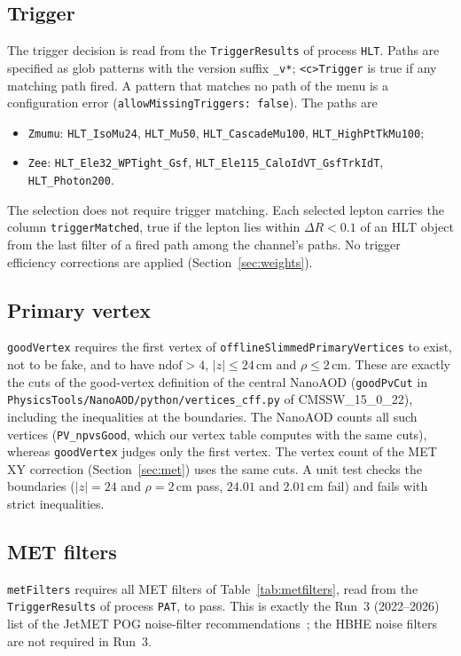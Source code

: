 \documentclass[11pt]{article}
\newcommand{\code}[1]{\texttt{#1}}
\begin{document}
\subsection{Trigger}
\label{sec:trigger}
The trigger decision is read from the \code{TriggerResults} of process \code{HLT}. Paths are specified as glob
patterns with the version suffix \code{\_v*}; \code{<c>Trigger} is true if any matching path fired. A pattern that
matches no path of the menu is a configuration error (\code{allowMissingTriggers: false}). The paths are
\begin{itemize}
\item \code{Zmumu}: \code{HLT\_IsoMu24}, \code{HLT\_Mu50}, \code{HLT\_CascadeMu100}, \code{HLT\_HighPtTkMu100};
\item \code{Zee}: \code{HLT\_Ele32\_WPTight\_Gsf}, \code{HLT\_Ele115\_CaloIdVT\_GsfTrkIdT}, \code{HLT\_Photon200}.
\end{itemize}
The selection does not require trigger matching. Each selected lepton carries the column \code{triggerMatched}, true if
the lepton lies within $\Delta R < 0.1$ of an HLT object from the last filter of a fired path among the channel's
paths. No trigger efficiency corrections are applied (Section~\ref{sec:weights}).

\subsection{Primary vertex}
\label{sec:vertex}
\code{goodVertex} requires the first vertex of \code{offlineSlimmedPrimaryVertices} to exist, not to be fake, and to
have $\mathrm{ndof} > 4$, $|z| \leq 24\,\mathrm{cm}$ and $\rho \leq 2\,\mathrm{cm}$. These are exactly the cuts of the
good-vertex definition of the central NanoAOD (\code{goodPvCut} in \code{PhysicsTools/NanoAOD/python/vertices\_cff.py}
of CMSSW\_15\_0\_22), including the inequalities at the boundaries. The NanoAOD counts all such vertices
(\code{PV\_npvsGood}, which our vertex table computes with the same cuts), whereas \code{goodVertex} judges only the
first vertex. The vertex count of the MET XY correction (Section~\ref{sec:met}) uses the same cuts. A unit test checks
the boundaries ($|z| = 24$ and $\rho = 2\,\mathrm{cm}$ pass, $24.01$ and $2.01\,\mathrm{cm}$ fail) and fails with
strict inequalities.

\subsection{MET filters}
\label{sec:metfilters}
\code{metFilters} requires all MET filters of Table~\ref{tab:metfilters}, read from the \code{TriggerResults} of
process \code{PAT}, to pass. This is exactly the Run~3 (2022--2026) list of the JetMET POG noise-filter
recommendations~\cite{JMEmetfilters}; the HBHE noise filters are not required in Run~3.
\end{document}
